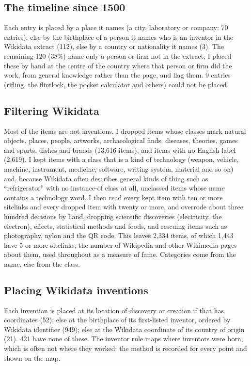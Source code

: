 \documentclass[11pt,a4paper]{article}
\begin{document}
\subsection{The timeline since 1500}
Each entry is placed by a place it names (a city, laboratory or company: 70 entries), else by the birthplace of a person it names who is an inventor in the Wikidata extract (112), else by a country or nationality it names (3). The remaining 120 (38\%) name only a person or firm not in the extract; I placed these by hand at the centre of the country where that person or firm did the work, from general knowledge rather than the page, and flag them. 9 entries (rifling, the flintlock, the pocket calculator and others) could not be placed.

\subsection{Filtering Wikidata}
Most of the items are not inventions. I dropped items whose classes mark natural objects, places, people, artworks, archaeological finds, diseases, theories, games and sports, dishes and brands (13,616 items), and items with no English label (2,619). I kept items with a class that is a kind of technology (weapon, vehicle, machine, instrument, medicine, software, writing system, material and so on) and, because Wikidata often describes general kinds of thing such as ``refrigerator'' with no instance-of class at all, unclassed items whose name contains a technology word. I then read every kept item with ten or more sitelinks and every dropped item with twenty or more, and overrode about three hundred decisions by hand, dropping scientific discoveries (electricity, the electron), effects, statistical methods and foods, and rescuing items such as photography, nylon and the QR code. This leaves 2,334 items, of which 1,443 have 5 or more sitelinks, the number of Wikipedia and other Wikimedia pages about them, used throughout as a measure of fame. Categories come from the name, else from the class.

\subsection{Placing Wikidata inventions}
Each invention is placed at its location of discovery or creation if that has coordinates (52); else at the birthplace of its first-listed inventor, ordered by Wikidata identifier (949); else at the Wikidata coordinate of its country of origin (21). 421 have none of these. The inventor rule maps where inventors were born, which is often not where they worked: the method is recorded for every point and shown on the map.
\end{document}
